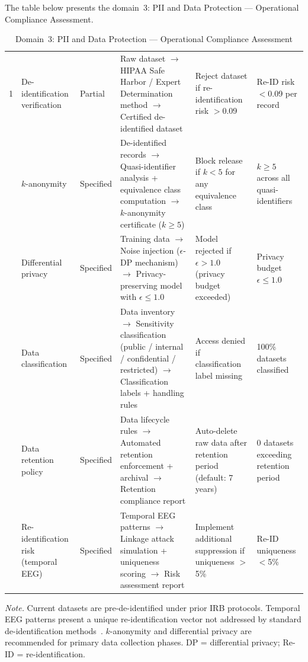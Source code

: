 \noindent The table below presents the domain~3: PII and Data Protection --- Operational Compliance Assessment.

\begin{table}[H]
\tablestripes
\tablefontsize
\caption[PII and Data Protection Assessment]{Domain~3: PII and Data Protection --- Operational Compliance Assessment}
\begin{tabularx}{\textwidth}{@{} p{0.4cm} p{2cm} p{1.4cm} L L p{1.8cm} @{}}
\toprule
\thead{\#} &  &  &  &  &  \\
 & De-identification verification & Partial & Raw dataset $\to$ HIPAA Safe Harbor / Expert Determination method $\to$ Certified de-identified dataset & Reject dataset if re-identification risk $>$0.09 & Re-ID risk $<$0.09 per record \\
 & $k$-anonymity & Specified & De-identified records $\to$ Quasi-identifier analysis + equivalence class computation $\to$ $k$-anonymity certificate ($k \geq 5$) & Block release if $k < 5$ for any equivalence class & $k \geq 5$ across all quasi-identifiers \\
 & Differential privacy & Specified & Training data $\to$ Noise injection ($\epsilon$-DP mechanism) $\to$ Privacy-preserving model with $\epsilon \leq 1.0$ & Model rejected if $\epsilon > 1.0$ (privacy budget exceeded) & Privacy budget $\epsilon \leq 1.0$ \\
 & Data classification & Specified & Data inventory $\to$ Sensitivity classification (public / internal / confidential / restricted) $\to$ Classification labels + handling rules & Access denied if classification label missing & 100\% datasets classified \\
 & Data retention policy & Specified & Data lifecycle rules $\to$ Automated retention enforcement + archival $\to$ Retention compliance report & Auto-delete raw data after retention period (default: 7 years) & 0 datasets exceeding retention period \\
 & Re-identification risk (temporal EEG) & Specified & Temporal EEG patterns $\to$ Linkage attack simulation + uniqueness scoring $\to$ Risk assessment report & Implement additional suppression if uniqueness $>$5\% & Re-ID uniqueness $<$5\% \\
\bottomrule
\end{tabularx}
\vspace{0.5em}\noindent\textit{Note.} Current datasets are pre-de-identified under prior IRB protocols. Temporal EEG patterns present a unique re-identification vector not addressed by standard de-identification methods~\cite{char2018ethics}. $k$-anonymity and differential privacy are recommended for primary data collection phases. DP = differential privacy; Re-ID = re-identification.
\end{table}

